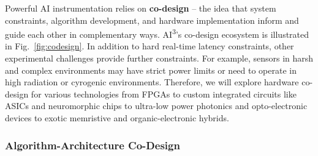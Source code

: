 Powerful AI instrumentation relies on {\bf co-design} -- the idea that system constraints, algorithm development, and hardware implementation inform and guide each other in complementary ways. 
AI\textsuperscript{3}'s co-design ecosystem is illustrated in Fig.~\ref{fig:codesign}. In addition to hard real-time latency constraints, other experimental challenges provide further constraints.  For example, sensors in harsh and complex environments may have strict power limits or need to operate in high radiation or cyrogenic environments.  Therefore, we will explore hardware co-design for various technologies from FPGAs to custom integrated circuits like ASICs and neuromorphic chips to ultra-low power photonics and opto-electronic devices to exotic memristive and organic-electronic hybrids. 


\subsubsection{Algorithm-Architecture Co-Design} \label{sec:HwAlgo}

